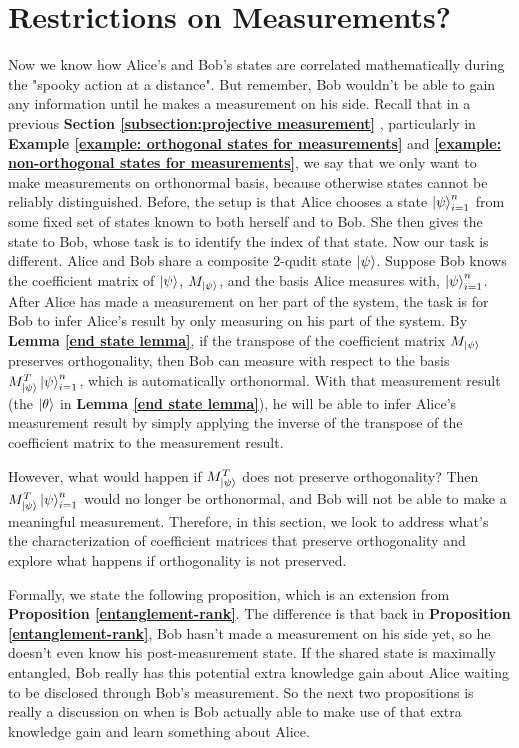 \section{Restrictions on Measurements?}
Now we know how Alice's and Bob's states are correlated mathematically during the "spooky action at a distance". But remember, Bob wouldn't be able to gain any information until he makes a measurement on his side. Recall that in a previous \textbf{Section \ref{subsection:projective measurement}} , particularly in \textbf{Example \ref{example: orthogonal states for measurements}} and \textbf{\ref{example: non-orthogonal states for measurements}}, we say that we only want to make measurements on orthonormal basis, because otherwise states cannot be reliably distinguished. Before, the setup is that Alice chooses a state $\ket{\psi}_{i=1}^n$ from some fixed set of states known to both herself and to Bob. She then gives the state to Bob, whose task is to identify the index of that state. Now our task is different. Alice and Bob share a composite 2-qudit state $\ket{\psi}$. Suppose Bob knows the coefficient matrix of $\ket{\psi}$, $M_{\ket{\psi}}$, and the basis Alice measures with, $\ket{\psi}_{i=1}^n$. After Alice has made a measurement on her part of the system, the task is for Bob to infer Alice's result by only measuring on his part of the system. By \textbf{Lemma \ref{end state lemma}}, if the transpose of the coefficient matrix $M_{\ket{\psi}}$ preserves orthogonality, then Bob can measure with respect to the basis $M_{\ket{\psi}}^T \ket{\psi}_{i=1}^n$, which is automatically orthonormal. With that measurement result (the $\ket{\theta}$ in \textbf{Lemma \ref{end state lemma}}), he will be able to infer Alice's measurement result by simply applying the inverse of the transpose of the coefficient matrix to the measurement result. 

However, what would happen if $M_{\ket{\psi}}^T$ does not preserve orthogonality? Then $M_{\ket{\psi}}^T \ket{\psi}_{i=1}^n$ would no longer be orthonormal, and Bob will not be able to make a meaningful measurement. Therefore, in this section, we look to address what's the characterization of coefficient matrices that preserve orthogonality and explore what happens if orthogonality is not preserved.

Formally, we state the following proposition, which is an extension from \textbf{Proposition \ref{entanglement-rank}}. The difference is that back in \textbf{Proposition \ref{entanglement-rank}}, Bob hasn't made a measurement on his side yet, so he doesn't even know his post-measurement state. If the shared state is maximally entangled, Bob really has this potential extra knowledge gain about Alice waiting to be disclosed through Bob's measurement. So the next two propositions is really a discussion on when is Bob actually able to make use of that extra knowledge gain and learn something about Alice.

